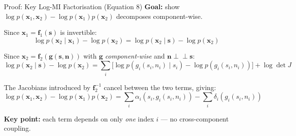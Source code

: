 \documentclass[aspectratio=169, 10pt]{beamer}
\begin{document}
\begin{frame}{Proof: Key Log-MI Factorisation (Equation 8)}
  \textbf{Goal:} show $\log p(\mathbf{x}_1,\mathbf{x}_2)-\log p(\mathbf{x}_1)p(\mathbf{x}_2)$
  decomposes component-wise.

  \medskip
  Since $\mathbf{x}_1=\mathbf{f}_1(\mathbf{s})$ is invertible:
  \[
    \log p(\mathbf{x}_2\mid\mathbf{x}_1) - \log p(\mathbf{x}_2)
    = \log p(\mathbf{x}_2\mid\mathbf{s}) - \log p(\mathbf{x}_2)
  \]

  Since $\mathbf{x}_2 = \mathbf{f}_2(\mathbf{g}(\mathbf{s},\mathbf{n}))$ with
  $\mathbf{g}$ \emph{component-wise} and $\mathbf{n}\perp\!\!\!\perp\mathbf{s}$:
  \[
    \log p(\mathbf{x}_2\mid\mathbf{s}) - \log p(\mathbf{x}_2)
    = \sum_i \bigl[\log p(g_i(s_i,n_i)\mid s_i) - \log p(g_i(s_i,n_i))\bigr]
    + \log\det J
  \]

  The Jacobians introduced by $\mathbf{f}_2^{-1}$ cancel between the two terms, giving:
  \[
    \boxed{
      \log p(\mathbf{x}_1,\mathbf{x}_2) - \log p(\mathbf{x}_1)p(\mathbf{x}_2)
      = \sum_i \alpha_i(s_i, g_i(s_i,n_i)) - \sum_i \delta_i(g_i(s_i,n_i))
    }
  \]

  \textbf{Key point:} each term depends on only \emph{one} index $i$ — no cross-component coupling.
\end{frame}
\end{document}
